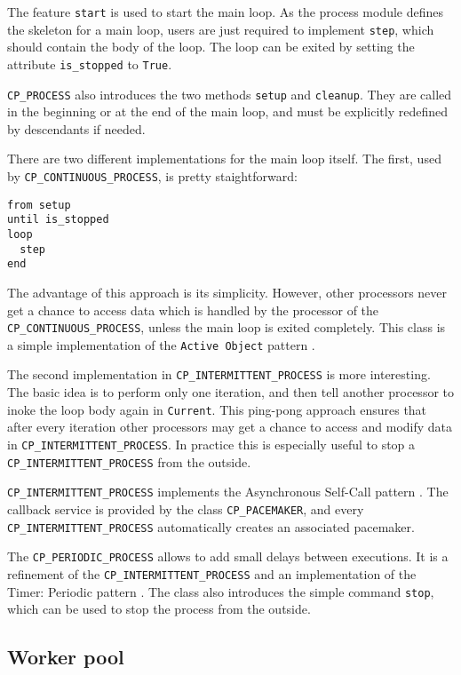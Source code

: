 The feature \lstinline!start! is used to start the main loop.
As the process module defines the skeleton for a main loop, users are just required to implement \lstinline!step!, which should contain the body of the loop.
The loop can be exited by setting the attribute \lstinline!is_stopped! to \lstinline!True!.

\lstinline!CP_PROCESS! also introduces the two methods \lstinline!setup! and \lstinline!cleanup!.
They are called in the beginning or at the end of the main loop, and must be explicitly redefined by descendants if needed.

There are two different implementations for the main loop itself.
The first, used by \lstinline!CP_CONTINUOUS_PROCESS!, is pretty staightforward:
\begin{lstlisting}
from setup
until is_stopped
loop
  step
end
\end{lstlisting}
The advantage of this approach is its simplicity.
However, other processors never get a chance to access data which is handled by the processor of the \lstinline!CP_CONTINUOUS_PROCESS!, unless the main loop is exited completely.
This class is a simple implementation of the \lstinline!Active Object! pattern .

The second implementation in \lstinline!CP_INTERMITTENT_PROCESS! is more interesting.
The basic idea is to perform only one iteration, and then tell another processor to inoke the loop body again in \lstinline!Current!.
This ping-pong approach ensures that after every iteration other processors may get a chance to access and modify data in \lstinline!CP_INTERMITTENT_PROCESS!.
In practice this is especially useful to stop a \lstinline!CP_INTERMITTENT_PROCESS! from the outside.

\lstinline!CP_INTERMITTENT_PROCESS! implements the Asynchronous Self-Call pattern .
The callback service is provided by the class \lstinline!CP_PACEMAKER!, and every \lstinline!CP_INTERMITTENT_PROCESS! automatically creates an associated pacemaker.

The \lstinline!CP_PERIODIC_PROCESS! allows to add small delays between executions. 
It is a refinement of the \lstinline!CP_INTERMITTENT_PROCESS! and an implementation of the Timer: Periodic pattern .
The class also introduces the simple command \lstinline!stop!, which can be used to stop the process from the outside.


\subsection{Worker pool}
\label{sec:worker_pool} 

